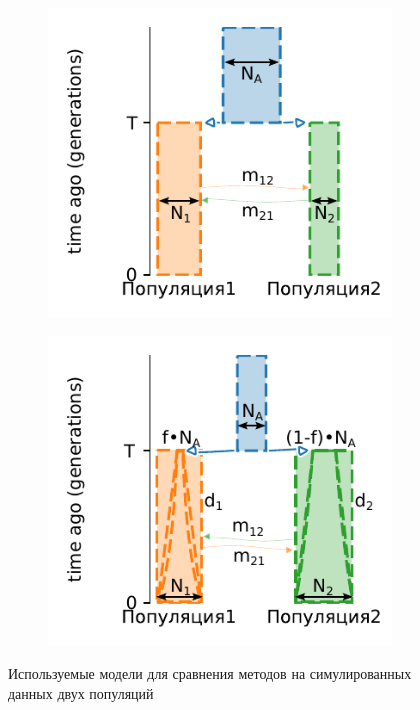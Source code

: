 \begin{figure}[ht]
    \centering
    \begin{subfigure}[b]{.4\textwidth}
    \includegraphics[width=\textwidth]{images_experiments/simulation_1/2pop/picture_1pop_model_1.pdf}
    \caption{}
    \label{fig:part2:experiments:simulated_2:models_1}
    \end{subfigure}%
    \begin{subfigure}[b]{.4\textwidth}
    \includegraphics[width=\textwidth]{images_experiments/simulation_1/2pop/picture_1pop_model_2.pdf}
    \caption{}
    \label{fig:part2:experiments:simulated_2:models_2}
    \end{subfigure}
    \caption{Используемые модели для сравнения методов на симулированных данных двух популяций}
    \label{fig:part2:experiments:simulated_2:models}
\end{figure}



